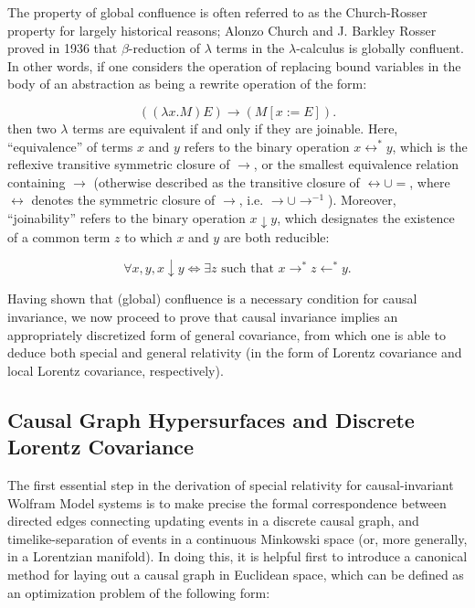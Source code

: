 \documentclass{article}
\begin{document}
The property of global confluence is often referred to as the Church-Rosser property for largely historical reasons; Alonzo Church and J. Barkley Rosser proved in 1936\cite{church} that ${\beta}$-reduction of ${\lambda}$ terms in the ${\lambda}$-calculus is globally confluent. In other words, if one considers the operation of replacing bound variables in the body of an abstraction as being a rewrite operation of the form:

\begin{equation}
\left( \left( \lambda x . M \right) E \right) \to \left( M \left[ x := E \right] \right).
\end{equation}
then two ${\lambda}$ terms are equivalent if and only if they are joinable. Here, ``equivalence'' of terms $x$ and $y$ refers to the binary operation ${x \leftrightarrow^{*} y}$, which is the reflexive transitive symmetric closure of ${\to}$, or the smallest equivalence relation containing ${\to}$ (otherwise described as the transitive closure of ${\leftrightarrow \cup =}$, where ${\leftrightarrow}$ denotes the symmetric closure of ${\to}$, i.e. ${\to \cup \to^{-1}}$). Moreover, ``joinability'' refers to the binary operation ${x \downarrow y}$, which designates the existence of a common term $z$ to which $x$ and $y$ are both reducible:

\begin{equation}
\forall x, y, x \downarrow y \iff \exists z \text{ such that } x \to^{*} z \leftarrow^{*} y.
\end{equation}

Having shown that (global) confluence is a necessary condition for causal invariance, we now proceed to prove that causal invariance implies an appropriately discretized form of general covariance, from which one is able to deduce both special and general relativity (in the form of Lorentz covariance and local Lorentz covariance, respectively).

\subsection{Causal Graph Hypersurfaces and Discrete Lorentz Covariance}
\label{sec:CurrentStatus3}

The first essential step in the derivation of special relativity for causal-invariant Wolfram Model systems is to make precise the formal correspondence between directed edges connecting updating events in a discrete causal graph, and timelike-separation of events in a continuous Minkowski space (or, more generally, in a Lorentzian manifold). In doing this, it is helpful first to introduce a canonical method for laying out a causal graph in Euclidean space, which can be defined as an optimization problem of the following form\cite{battista}\cite{battista2}:
\end{document}
